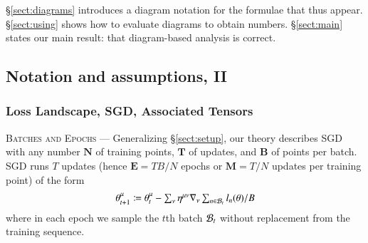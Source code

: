 

        \S\ref{sect:diagrams} introduces a diagram
        notation for the formulae that thus appear.  \S\ref{sect:using} shows
        how to evaluate diagrams to obtain numbers.  \S\ref{sect:main} states
        our main result: that diagram-based analysis is correct.

        \subsection{Notation and assumptions, II}\label{sect:background}


            \subsubsection{Loss Landscape, SGD, Associated Tensors}
            \textsc{Batches and Epochs} --- Generalizing \S\ref{sect:setup}, our theory describes SGD with
            any number
                {$\mathbf{N}$ of training points},
                {$\mathbf{T}$ of updates}, and 
                {$\mathbf{B}$ of points per batch}.
            SGD runs $T$ updates (hence
                {$\mathbf{E}=TB/N$ epochs} or
                {$\mathbf{M}=T/N$ updates per training point}) of the form
            $$
                \textstyle
                \theta_{t+1}^\mu
                \coloneqq
                \theta_t^\mu -
                \sum_\nu
                \eta^{\mu\nu} \nabla_\nu
                    \sum_{n\in \mathcal{B}_t} l_n(\theta) / B
            $$
            where in each epoch %
            we sample the
            $t$th batch $\mathcal{B}_t$ without replacement from the training sequence.

